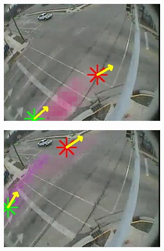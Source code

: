\begin{figure}
\begin{subfigure}{0.32\linewidth}
        \end{subfigure}
        \begin{subfigure}{0.32\linewidth}
            \includegraphics[width=\linewidth]{./img/scene_learning/res/intersection_4/intersection_4-2.jpg}
        \end{subfigure}
        \begin{subfigure}{0.32\linewidth}
            \includegraphics[width=\linewidth]{./img/scene_learning/res/intersection_4/intersection_4-3.jpg}
        \end{subfigure}
        \begin{subfigure}{0.32\linewidth}

\end{subfigure}
\end{figure}
